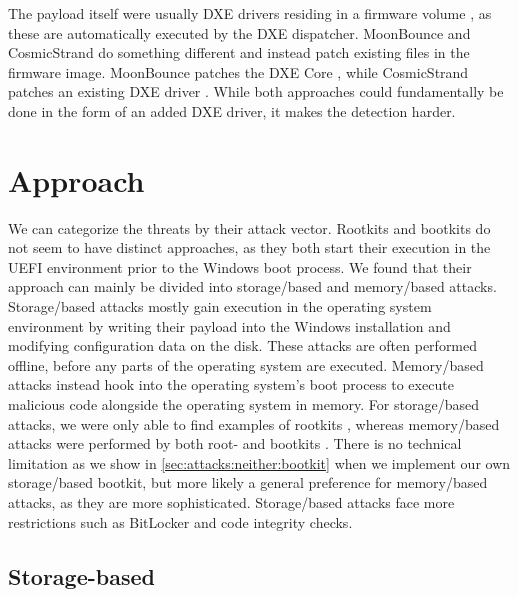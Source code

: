 The payload itself were usually \ac{DXE} drivers residing in a firmware volume \cite{mosaicregressor-technical-details,lojax}, as these are automatically executed by the \ac{DXE} dispatcher.
MoonBounce and CosmicStrand do something different and instead patch existing files in the firmware image.
MoonBounce patches the \ac{DXE} Core \cite{moonbounce}, while CosmicStrand patches an existing \ac{DXE} driver \cite{cosmicstrand}.
While both approaches could fundamentally be done in the form of an added \ac{DXE} driver, it makes the detection harder.

\section{Approach}

We can categorize the threats by their attack vector.
Rootkits and bootkits do not seem to have distinct approaches, as they both start their execution in the \ac{UEFI} environment prior to the Windows boot process.
We found that their approach can mainly be divided into storage\-/based and memory\-/based attacks.
Storage\-/based attacks mostly gain execution in the operating system environment by writing their payload into the Windows installation and modifying configuration data on the disk.
These attacks are often performed offline, before any parts of the operating system are executed.
Memory\-/based attacks instead hook into the operating system's boot process to execute malicious code alongside the operating system in memory.
For storage\-/based attacks, we were only able to find examples of rootkits \cite{vector-edk,mosaicregressor-technical-details,lojax}, whereas memory\-/based attacks were performed by both root- and bootkits \cite{dreamboot,efiguard,especter,finspy,moonbounce,cosmicstrand}.
There is no technical limitation as we show in \autoref{sec:attacks:neither:bootkit} when we implement our own storage\-/based bootkit, but more likely a general preference for memory\-/based attacks, as they are more sophisticated.
Storage\-/based attacks face more restrictions such as BitLocker and code integrity checks.

\subsection{Storage-based}

